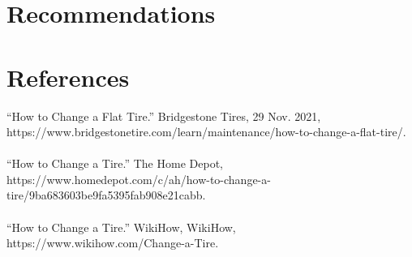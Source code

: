 \documentclass[12pt,A4paper]{article}
\begin{document}
	\section{Recommendations}

	\section{References}
	“How to Change a Flat Tire.” Bridgestone Tires, 29 Nov. 2021, https://www.bridgestonetire.com/learn/maintenance/how-to-change-a-flat-tire/.\\ \\
	“How to Change a Tire.” The Home Depot, https://www.homedepot.com/c/ah/how-to-change-a-tire/9ba683603be9fa5395fab908e21cabb.\\ \\
	“How to Change a Tire.” WikiHow, WikiHow, https://www.wikihow.com/Change-a-Tire.\\
\end{document}
